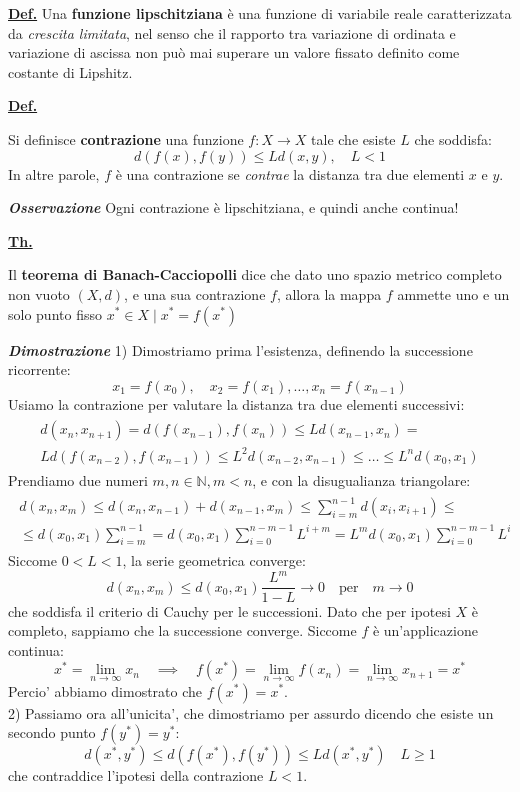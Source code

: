 \documentclass[a4paper,10pt]{article} %
\renewcommand{\b}[1]{%
    {\textbf{#1}}}
\newcommand{\ldef}[1]{%
    {\smallbreak\par\normalsize\textbf{\underline{Def.}} {#1} \smallbreak}}
\newcommand{\ltheorem}[1]{%
    {\smallbreak\par\normalsize\textbf{\underline{Th.}} {#1} \smallbreak\par}}
\newcommand{\ldim}[1]{%
    {\smallbreak\par\scriptsize\emph{\textbf{Dimostrazione}} {#1} \par}}
\newcommand{\loss}[1]{%
    {\smallbreak\par\scriptsize\emph{\textbf{Osservazione}} {#1} \par}}
\begin{document}
\begin{multicols}{2}
\ldef{
    Una \b{funzione lipschitziana} è una funzione di variabile reale caratterizzata da \emph{crescita limitata}, nel senso che il rapporto tra variazione di ordinata e variazione di ascissa non può mai superare un valore fissato definito come costante di Lipshitz.
}

\ldef{
    Si definisce \b{contrazione} una funzione $f : X \rightarrow X$ tale che esiste $L$ che soddisfa:
    $$
    d(f(x), f(y)) \leq Ld(x,y), \quad L < 1
    $$
    In altre parole, $f$ è una contrazione se \emph{contrae} la distanza tra due elementi $x$ e $y$.
    \loss{
        Ogni contrazione è lipschitziana, e quindi anche continua!
    }
}

\ltheorem{
    Il \b{teorema di Banach-Cacciopolli} dice che dato uno spazio metrico completo non vuoto $(X, d)$, e una sua contrazione $f$, allora la mappa $f$ ammette uno e un solo punto fisso $x^* \in X \mid x^* = f(x^*) $
    \ldim{
        1) Dimostriamo prima l'esistenza, definendo la successione ricorrente:
        $$ x_1 = f(x_0), \quad x_2 = f(x_1), \dots, x_n = f(x_{n-1}) $$
        Usiamo la contrazione per valutare la distanza tra due elementi successivi:
        \begin{gather}
        \begin{split}
        d(x_n, x_{n+1}) = d(f(x_{n-1}), f(x_n)) \leq Ld(x_{n-1}, x_n) = \\
        Ld(f(x_{n-2}), f(x_{n-1})) \leq L^2 d(x_{n-2},x_{n-1}) \leq \dots \leq L^n d(x_0, x_1) 
        \end{split}
        \end{gather}
        Prendiamo due numeri $m, n \in \mathbb{N}, m < n$, e con la disugualianza triangolare:
        \begin{gather}
        \begin{split}
        d(x_n, x_m) \leq d(x_n, x_{n-1}) + d(x_{n-1}, x_m) \leq \sum_{i=m}^{n-1} d(x_i, x_{i+1}) \leq \\
        \leq d(x_0, x_1) \sum_{i=m}^{n-1} = d(x_0, x_1) \sum_{i=0}^{n-m-1} L^{i+m} = L^m d(x_0, x_1) \sum_{i=0}^{n-m-1} L^i
        \end{split}
        \end{gather}
        Siccome $0 < L < 1$, la serie geometrica converge:
        $$ d(x_n, x_m) \leq d(x_0, x_1) \frac{L^m}{1 - L} \rightarrow 0 \quad \text{per} \quad m \rightarrow 0 $$
        che soddisfa il criterio di Cauchy per le successioni. Dato che per ipotesi $X$ \`{e} completo, 
        sappiamo che la successione converge. Siccome $f$ \`{e} un'applicazione continua:
        $$ x^* = \lim_{n \rightarrow \infty} x_n \quad \implies \quad f(x^*) = \lim_{n \rightarrow \infty} f(x_n) = \lim_{n \rightarrow \infty} x_{n+1} = x^* $$
        Percio' abbiamo dimostrato che $f(x^*) = x^*$. \\
        2) Passiamo ora all'unicita', che dimostriamo per assurdo dicendo che esiste un secondo punto $f(y^*) = y^*$:
        $$ d(x^*, y^*) \leq d(f(x^*), f(y^*)) \leq Ld(x^*, y^*) \quad   L \geq 1 $$
        che contraddice l'ipotesi della contrazione $L < 1$.
    }
}


\end{multicols}
\end{document}
